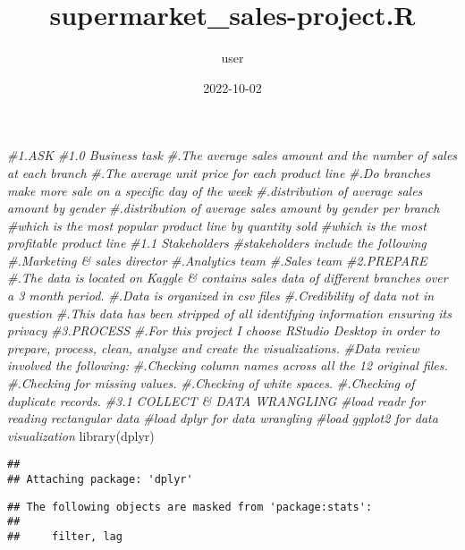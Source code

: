 \documentclass[
]{article}
\title{supermarket\_sales-project.R}
\author{user}
\date{2022-10-02}
\newenvironment{Shaded}{\begin{snugshade}}{\end{snugshade}}
\newcommand{\CommentTok}[1]{\textcolor[rgb]{0.56,0.35,0.01}{\textit{#1}}}
\newcommand{\FunctionTok}[1]{\textcolor[rgb]{0.00,0.00,0.00}{#1}}
\newcommand{\NormalTok}[1]{#1}
\begin{document}
\maketitle

\begin{Shaded}
\begin{Highlighting}[]
\CommentTok{\#1.ASK}
\CommentTok{\#1.0 Business task}
\CommentTok{\#.The average sales amount and the number of sales at each branch }
\CommentTok{\#.The average unit price for each product line}
\CommentTok{\#.Do branches make more sale on a specific day of the week}
\CommentTok{\#.distribution of average sales amount by gender}
\CommentTok{\#.distribution of average sales amount by gender per branch}
\CommentTok{\#which is the most popular product line by quantity sold}
\CommentTok{\#which is the most profitable product line}
\CommentTok{\#1.1 Stakeholders}
\CommentTok{\#stakeholders include the following}
\CommentTok{\#.Marketing \& sales director}
\CommentTok{\#.Analytics team}
\CommentTok{\#.Sales team}
\CommentTok{\#2.PREPARE}
\CommentTok{\#.The data is located on Kaggle \& contains sales data of different branches over a 3 month period.}
\CommentTok{\#.Data is organized in csv files}
\CommentTok{\#.Credibility of data not in question}
\CommentTok{\#.This data has been stripped of all identifying information ensuring its privacy}
\CommentTok{\#3.PROCESS}
\CommentTok{\#.For this project I choose RStudio Desktop in order to prepare, process, clean, analyze and create the visualizations.}
\CommentTok{\#Data review involved the following:}
\CommentTok{\#.Checking column names across all the 12 original files.}
\CommentTok{\#.Checking for missing values.}
\CommentTok{\#.Checking of white spaces.}
\CommentTok{\#.Checking of duplicate records.}
\CommentTok{\#3.1 COLLECT \& DATA WRANGLING}
\CommentTok{\#load readr for reading rectangular data}
\CommentTok{\#load dplyr for data wrangling}
\CommentTok{\#load ggplot2 for data visualization}
\FunctionTok{library}\NormalTok{(dplyr)}
\end{Highlighting}
\end{Shaded}

\begin{verbatim}
## 
## Attaching package: 'dplyr'
\end{verbatim}

\begin{verbatim}
## The following objects are masked from 'package:stats':
## 
##     filter, lag
\end{verbatim}
\end{document}
